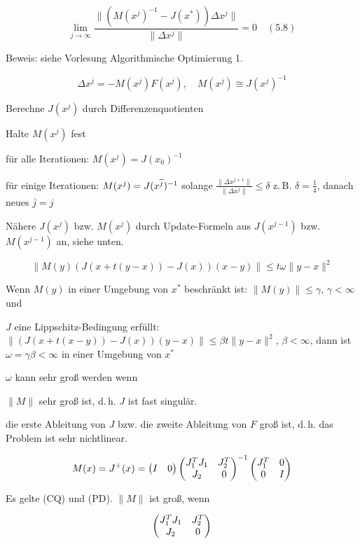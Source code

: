 \[ \lim_{j \to \infty} \frac{\| (M(x^j)^{-1} - J(x^*)) \Delta x^j \|}{\|\Delta x^j\|} = 0 \quad (5.8) \]

Beweis: siehe Vorlesung Algorithmische Optimierung 1.


\[ \Delta x^j = -M(x^j) F(x^j), \quad M(x^j) \cong J(x^j)^{-1} \]

\bitm
\item Berechne $J(x^j)$ durch Differenzenquotienten
\item Halte $M(x^j)$ fest
\bitm
	\item für alle Iterationen: $M(x^j) = J(x_0)^{-1}$
	\item für einige Iterationen: $M(x^j) = J(x^{\overline j})^{-1}$ solange $\frac{\| \Delta x^{j+1} \|}{\|\Delta x^j\|} \leq \delta$ z.\,B. $\delta = \frac 14$, danach neues $\overline j = j$ 
\eitm
\item Nähere $J(x^j)$ bzw. $M(x^j)$ durch Update-Formeln aus $J(x^{j-1})$ bzw. $M(x^{j-1})$ an, siehe unten.
\eitm


\[ \| M(y) (J(x+t(y-x)) - J(x)) (x-y) \| \leq t \omega \|y-x\|^2 \]

\bitm
\item Wenn $M(y)$ in einer Umgebung von $x^*$ beschränkt ist: $\|M(y)\| \leq \gamma$, $\gamma < \infty$ und
\item $J$ eine Lippschitz-Bedingung erfüllt: $\|(J(x+t(x-y))-J(x)) (y-x)\| \leq \beta t \|y-x\|^2$, $\beta < \infty$, dann ist $\omega = \gamma \beta < \infty$ in einer Umgebung von $x^*$
\eitm

$\omega$ kann sehr groß werden wenn

\bitm
\item $\|M\|$ sehr groß ist, d.\,h. $J$ ist fast singulär.
\item die erste Ableitung von $J$ bzw. die zweite Ableitung von $F$ groß ist, d.\,h. das Problem ist sehr nichtlinear.
\eitm


\[ M(x) = J^+(x) = \begin{pmatrix} I & 0 \end{pmatrix} \begin{pmatrix} J_1^T J_1 & J_2^T \\ J_2 & 0 \end{pmatrix}^{-1} \begin{pmatrix} J_1^T & 0 \\ 0 & I \end{pmatrix} \]

Es gelte (CQ) und (PD). $\|M\|$ ist groß, wenn

\[ \begin{pmatrix} J_1^T J_1 & J_2^T \\ J_2 & 0 \end{pmatrix} \]

